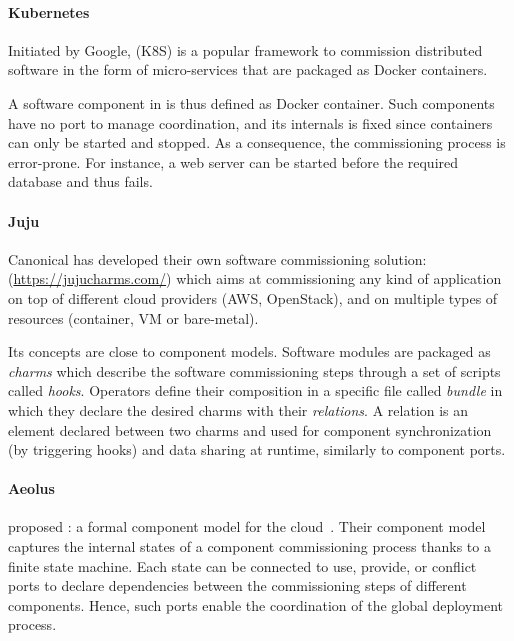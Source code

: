 \paragraph{Kubernetes}
Initiated by Google, \kubernetes (K8S) is a popular
framework to commission distributed software in the form of micro-services that
are packaged as Docker containers.

A software component in \kubernetes is thus defined as Docker container. Such
components have no port to manage coordination, and its internals is fixed since
containers can only be started and stopped. As a consequence, the commissioning
process is error-prone. For instance, a web server can be started before the
required database and thus fails.

\paragraph{Juju}
Canonical has developed their own software commissioning solution: \juju
(\url{https://jujucharms.com/}) which aims at commissioning any kind of
application on top of different cloud providers (\eg AWS, OpenStack), and on
multiple types of resources (container, VM or bare-metal).

Its concepts are close to component models. Software modules are packaged as
\juju \emph{charms} which describe the software commissioning steps through a
set of scripts called \emph{hooks}. Operators define their composition in a
specific file called \emph{bundle} in which they declare the desired charms with
their \emph{relations}. A relation is an element declared between two charms and
used for component synchronization (by triggering hooks) and data sharing at
runtime, similarly to component ports.

\paragraph{Aeolus}
\citeauthor{dicosmo2014ic} proposed \aeolus: a formal component model for the
cloud~\cite{dicosmo2014ic}. Their component model captures the internal states
of a component commissioning process thanks to a finite state machine. Each
state can be connected to use, provide, or conflict ports to declare
dependencies between the commissioning steps of different components. Hence,
such ports enable the coordination of the global deployment process.

